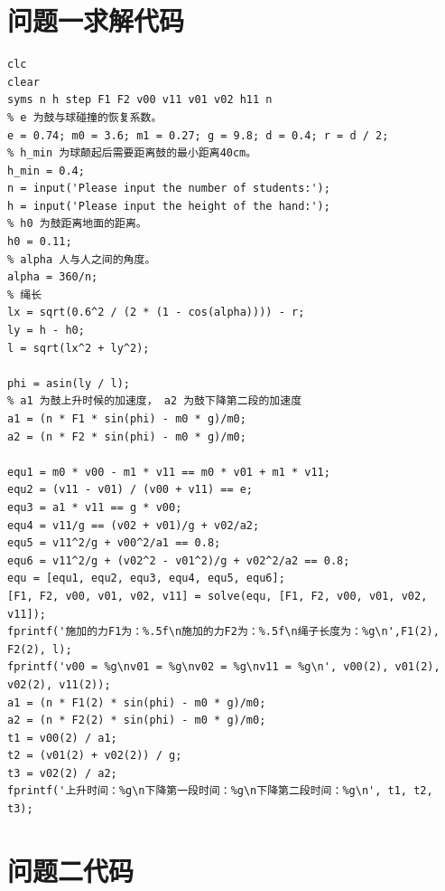 \documentclass{cumcm}
\begin{document}
\section{问题一求解代码}
\begin{lstlisting}
clc
clear
syms n h step F1 F2 v00 v11 v01 v02 h11 n
% e 为鼓与球碰撞的恢复系数。
e = 0.74; m0 = 3.6; m1 = 0.27; g = 9.8; d = 0.4; r = d / 2;
% h_min 为球颠起后需要距离鼓的最小距离40cm。
h_min = 0.4;
n = input('Please input the number of students:');
h = input('Please input the height of the hand:');
% h0 为鼓距离地面的距离。
h0 = 0.11;
% alpha 人与人之间的角度。
alpha = 360/n;
% 绳长
lx = sqrt(0.6^2 / (2 * (1 - cos(alpha)))) - r;
ly = h - h0;
l = sqrt(lx^2 + ly^2);

phi = asin(ly / l);
% a1 为鼓上升时候的加速度， a2 为鼓下降第二段的加速度
a1 = (n * F1 * sin(phi) - m0 * g)/m0;
a2 = (n * F2 * sin(phi) - m0 * g)/m0;

equ1 = m0 * v00 - m1 * v11 == m0 * v01 + m1 * v11;
equ2 = (v11 - v01) / (v00 + v11) == e;
equ3 = a1 * v11 == g * v00;
equ4 = v11/g == (v02 + v01)/g + v02/a2;
equ5 = v11^2/g + v00^2/a1 == 0.8;
equ6 = v11^2/g + (v02^2 - v01^2)/g + v02^2/a2 == 0.8;
equ = [equ1, equ2, equ3, equ4, equ5, equ6];
[F1, F2, v00, v01, v02, v11] = solve(equ, [F1, F2, v00, v01, v02, v11]);
fprintf('施加的力F1为：%.5f\n施加的力F2为：%.5f\n绳子长度为：%g\n',F1(2), F2(2), l);
fprintf('v00 = %g\nv01 = %g\nv02 = %g\nv11 = %g\n', v00(2), v01(2), v02(2), v11(2));
a1 = (n * F1(2) * sin(phi) - m0 * g)/m0;
a2 = (n * F2(2) * sin(phi) - m0 * g)/m0;
t1 = v00(2) / a1;
t2 = (v01(2) + v02(2)) / g;
t3 = v02(2) / a2;
fprintf('上升时间：%g\n下降第一段时间：%g\n下降第二段时间：%g\n', t1, t2, t3);

\end{lstlisting}

\section{问题二代码}
\end{document}
